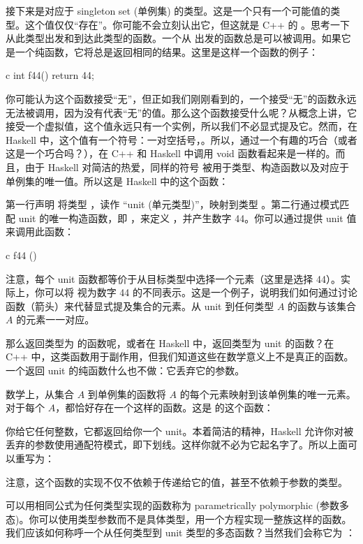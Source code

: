 接下来是对应于 singleton set (单例集) 的类型。这是一个只有一个可能值的类型。这个值仅仅“存在”。你可能不会立刻认出它，但这就是 C++ 的 。思考一下从此类型出发和到达此类型的函数。一个从  出发的函数总是可以被调用。如果它是一个纯函数，它将总是返回相同的结果。这里是这样一个函数的例子：

\begin{snip}{c}
int f44() { return 44; }
\end{snip}
你可能认为这个函数接受“无”，但正如我们刚刚看到的，一个接受“无”的函数永远无法被调用，因为没有代表“无”的值。那么这个函数接受什么呢？从概念上讲，它接受一个虚拟值，这个值永远只有一个实例，所以我们不必显式提及它。然而，在 Haskell 中，这个值有一个符号：一对空括号，\code{()}。所以，通过一个有趣的巧合（或者这是一个巧合吗？），在 C++ 和 Haskell 中调用 void 函数看起来是一样的。而且，由于 Haskell 对简洁的热爱，同样的符号 \code{()} 被用于类型、构造函数以及对应于单例集的唯一值。所以这是 Haskell 中的这个函数：

第一行声明  将类型 \code{()}，读作 “unit (单元类型)”，映射到类型 。第二行通过模式匹配 unit 的唯一构造函数，即 \code{()}，来定义 ，并产生数字 44。你可以通过提供 unit 值 \code{()} 来调用此函数：

\begin{snip}{c}
f44 ()
\end{snip}
注意，每个 unit 函数都等价于从目标类型中选择一个元素（这里是选择  44）。实际上，你可以将  视为数字 44 的不同表示。这是一个例子，说明我们如何通过讨论函数（箭头）来代替显式提及集合的元素。从 unit 到任何类型 $A$ 的函数与该集合 $A$ 的元素一一对应。

那么返回类型为  的函数呢，或者在 Haskell 中，返回类型为 unit 的函数？在 C++ 中，这类函数用于副作用，但我们知道这些在数学意义上不是真正的函数。一个返回 unit 的纯函数什么也不做：它丢弃它的参数。

数学上，从集合 $A$ 到单例集的函数将 $A$ 的每个元素映射到该单例集的唯一元素。对于每个 $A$，都恰好存在一个这样的函数。这是  的这个函数：

你给它任何整数，它都返回给你一个 unit。本着简洁的精神，Haskell 允许你对被丢弃的参数使用通配符模式，即下划线。这样你就不必为它起名字了。所以上面可以重写为：

注意，这个函数的实现不仅不依赖于传递给它的值，甚至不依赖于参数的类型。

可以用相同公式为任何类型实现的函数称为 parametrically polymorphic (参数多态)。你可以使用类型参数而不是具体类型，用一个方程实现一整族这样的函数。我们应该如何称呼一个从任何类型到 unit 类型的多态函数？当然我们会称它为 ：

